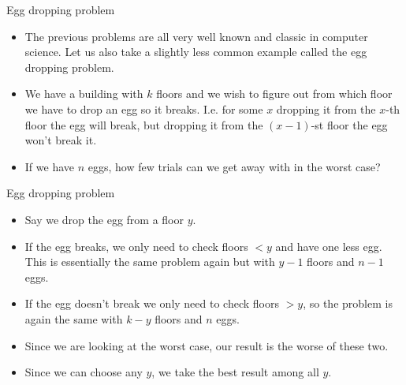 \documentclass{beamer}
\begin{document}
\begin{frame}[plain]{Egg dropping problem}
    \vspace{10pt}

    \begin{itemize}
        \item The previous problems are all very well known and classic in computer science. Let us also take a slightly less common example called the egg dropping problem.
        
        \item We have a building with $k$ floors and we wish to figure out from which floor we have to drop an egg so it breaks. I.e. for some $x$ dropping it from the $x$-th floor the egg will break, but dropping it from the $(x-1)$-st floor the egg won't break it.
        
        \item If we have $n$ eggs, how few trials can we get away with in the worst case?
    \end{itemize}
\end{frame}

\begin{frame}[plain]{Egg dropping problem}
    \vspace{10pt}

    \begin{itemize}
        \item Say we drop the egg from a floor $y$. 
        
        \item If the egg breaks, we only need to check floors $< y$ and have one less egg. This is essentially the same problem again but with $y - 1$ floors and $n - 1$ eggs.
        
        \item If the egg doesn't break we only need to check floors $> y$, so the problem is again the same with $k - y$ floors and $n$ eggs.
        
        \item Since we are looking at the worst case, our result is the worse of these two.
        
        \item Since we can choose any $y$, we take the best result among all $y$.
    \end{itemize}
\end{frame}
\end{document}
